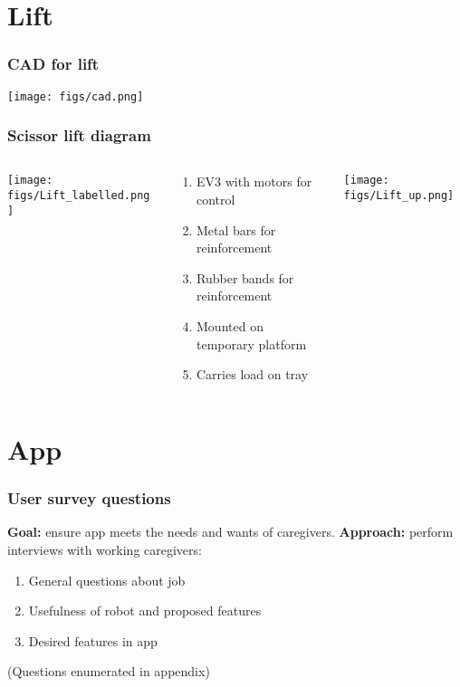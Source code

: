 \documentclass{beamer}
\begin{document}
\section{Lift}
\begin{frame}
  \frametitle{CAD for lift}
  \begin{center}
    \texttt{[image: figs/cad.png]}
  \end{center}
\end{frame}
\begin{frame}
  \frametitle{Scissor lift diagram}
  \begin{columns}
    \begin{column}{0.3\textwidth}
      \begin{center}
        \texttt{[image: figs/Lift\_labelled.png]}
      \end{center}
    \end{column}
    \begin{column}{0.3\textwidth}
      \begin{center}
      \begin{enumerate}
        \item EV3 with motors for control
        \item Metal bars for reinforcement
        \item Rubber bands for reinforcement
        \item Mounted on temporary platform
        \item Carries load on tray
        \end{enumerate}
      \end{center}
    \end{column}
    \begin{column}{0.3\textwidth}
      \begin{center}
        \texttt{[image: figs/Lift\_up.png]}
      \end{center}
    \end{column}
  \end{columns}
\end{frame}

\section{App}
\begin{frame}
  \frametitle{User survey questions}
  {\bf Goal: } ensure app meets the needs and wants of caregivers.
  {\bf Approach: } perform interviews with working caregivers: 
  \begin{enumerate}
    \item General questions about job
    \item Usefulness of robot and proposed features
    \item Desired features in app
  \end{enumerate}
  (Questions enumerated in appendix)
\end{frame}
\end{document}
